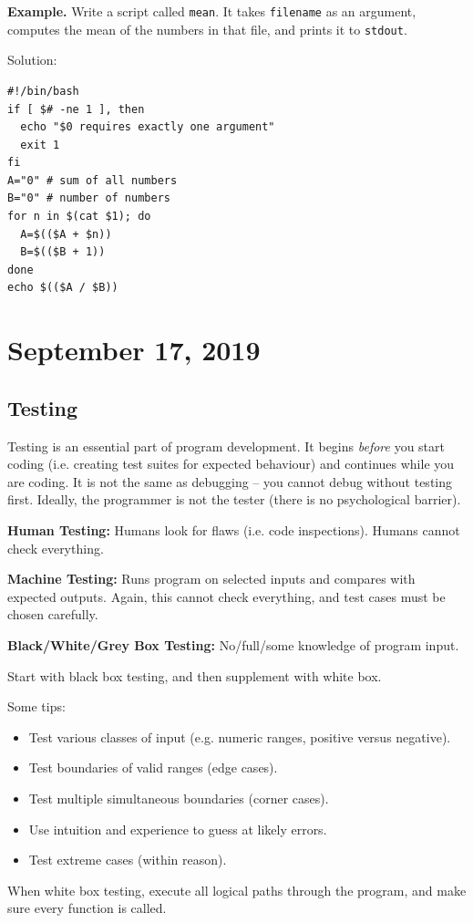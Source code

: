 \documentclass[11pt]{article}
\theoremstyle{definition}
\begin{document}
{\bf Example.} Write a script called {\tt mean}. It takes {\tt filename} as an argument, computes the mean of the numbers in that file, and prints it to {\tt stdout}.

Solution:
\begin{verbatim}
#!/bin/bash
if [ $# -ne 1 ], then
  echo "$0 requires exactly one argument"
  exit 1
fi
A="0" # sum of all numbers
B="0" # number of numbers
for n in $(cat $1); do
  A=$(($A + $n))
  B=$(($B + 1))
done
echo $(($A / $B))
\end{verbatim}
\newpage
\section{September 17, 2019}

\subsection{Testing}
Testing is an essential part of program development. It begins {\it before} you start coding (i.e. creating test suites for expected behaviour) and continues while you are coding. It is not the same as debugging -- you cannot debug without testing first. Ideally, the programmer is not the tester (there is no psychological barrier). 

{\bf Human Testing:} Humans look for flaws (i.e. code inspections). Humans cannot check everything.

{\bf Machine Testing:} Runs program on selected inputs and compares with expected outputs. Again, this cannot check everything, and test cases must be chosen carefully. 

{\bf Black/White/Grey Box Testing:} No/full/some knowledge of program input. 

Start with black box testing, and then supplement with white box. 

Some tips: \vspace{-0.25cm}
\begin{itemize}
    \item Test various classes of input (e.g. numeric ranges, positive versus negative).
    \item Test boundaries of valid ranges (edge cases). 
    \item Test multiple simultaneous boundaries (corner cases).
    \item Use intuition and experience to guess at likely errors.
    \item Test extreme cases (within reason).
\end{itemize}
\vspace{-0.25cm}
When white box testing, execute all logical paths through the program, and make sure every function is called.
\end{document}
